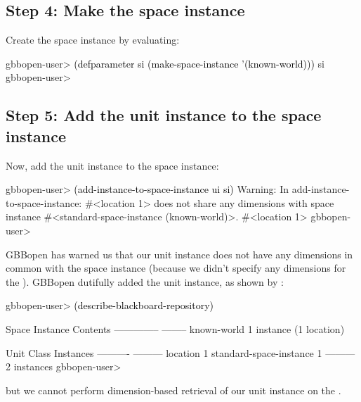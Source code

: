 \documentclass[10pt,twoside,english,pdftex]{article}
\begin{document}
\subsection*{Step 4: Make  the  space instance}

%
Create the  space instance by evaluating:
%
\W\supp
\begin{example}
\textcolor{darkergray}{%
  gbbopen-user> \textcolor{black}{(defparameter si (make-space-instance '(known-world)))}
  si
  gbbopen-user>}
\end{example}

\subsection*{Step 5: Add the unit instance to the space instance}

%
Now, add the  unit instance to the space instance:
%
\W\supp
\begin{example}
\textcolor{darkergray}{%
  gbbopen-user> \textcolor{black}{(add-instance-to-space-instance ui si)}
  Warning: In add-instance-to-space-instance: #<location 1>
           does not share any dimensions with space instance 
           #<standard-space-instance (known-world)>.
  #<location 1>
  gbbopen-user>}
\end{example}

%
GBBopen has warned us that our  unit instance does not
have any dimensions in common with the  space
instance (because we didn't specify any dimensions for the
).  GBBopen dutifully added the unit instance, as
shown by :
%
\W\supp
\begin{example}
\textcolor{darkergray}{%
  gbbopen-user> \textcolor{black}{(describe-blackboard-repository)}
  
  Space Instance                Contents
  --------------                --------
  known-world                   1 instance (1 location)

  Unit Class                    Instances
  ----------                    ---------
  location                              1
  standard-space-instance               1
                                ---------
                                        2 instances
  gbbopen-user>}
\end{example}
%
but we cannot perform dimension-based retrieval of our 
unit instance on the .
\end{document}
